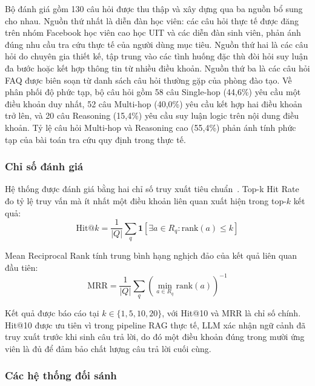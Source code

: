 Bộ đánh giá gồm 130 câu hỏi được thu thập và xây dựng qua ba nguồn bổ sung cho
nhau. Nguồn thứ nhất là diễn đàn học viên: các câu hỏi thực tế được đăng trên nhóm
Facebook học viên cao học UIT và các diễn đàn sinh viên, phản ánh đúng nhu cầu tra
cứu thực tế của người dùng mục tiêu. Nguồn thứ hai là các câu hỏi do chuyên gia thiết
kế, tập trung vào các tình huống đặc thù đòi hỏi suy luận đa bước hoặc kết hợp thông
tin từ nhiều điều khoản. Nguồn thứ ba là các câu hỏi FAQ được biên soạn từ danh sách
câu hỏi thường gặp của phòng đào tạo. Về phân phối độ phức tạp, bộ câu hỏi gồm 58
câu Single-hop (44,6\%) yêu cầu một điều khoản duy nhất, 52 câu Multi-hop (40,0\%)
yêu cầu kết hợp hai điều khoản trở lên, và 20 câu Reasoning (15,4\%) yêu cầu suy luận
logic trên nội dung điều khoản. Tỷ lệ câu hỏi Multi-hop và Reasoning cao (55,4\%) phản
ánh tính phức tạp của bài toán tra cứu quy định trong thực tế.

\subsubsection*{Chỉ số đánh giá}

Hệ thống được đánh giá bằng hai chỉ số truy xuất tiêu chuẩn~\cite{manning2008ir}.
Top-k Hit Rate đo tỷ lệ truy vấn mà ít nhất một điều khoản liên quan xuất hiện trong
top-$k$ kết quả:
\begin{equation}
  \text{Hit@}k = \frac{1}{|Q|} \sum_{q} \mathbf{1}\!\left[\exists a \in R_q : \text{rank}(a) \leq k\right]
  \label{eq:hitk}
\end{equation}

Mean Reciprocal Rank tính trung bình hạng nghịch đảo của kết quả liên quan đầu tiên:
\begin{equation}
  \text{MRR} = \frac{1}{|Q|} \sum_{q} \left(\min_{a \in R_q} \text{rank}(a)\right)^{-1}
  \label{eq:mrr}
\end{equation}

Kết quả được báo cáo tại $k \in \{1, 5, 10, 20\}$, với Hit@10 và MRR là chỉ số chính.
Hit@10 được ưu tiên vì trong pipeline RAG thực tế, LLM xác nhận ngữ cảnh đã truy
xuất trước khi sinh câu trả lời, do đó một điều khoản đúng trong mười ứng viên là đủ
để đảm bảo chất lượng câu trả lời cuối cùng.

\subsubsection*{Các hệ thống đối sánh}

